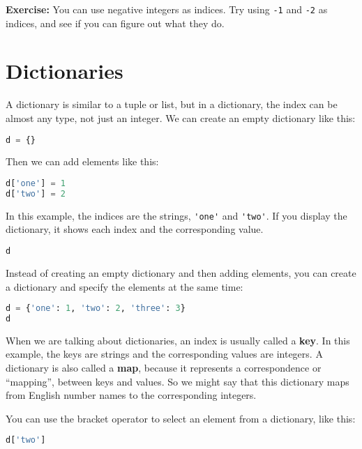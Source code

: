 \textbf{Exercise:} You can use negative integers as indices. Try using
\passthrough{\lstinline!-1!} and \passthrough{\lstinline!-2!} as
indices, and see if you can figure out what they do.

\hypertarget{dictionaries-1}{%
\section{Dictionaries}\label{dictionaries-1}}

A dictionary is similar to a tuple or list, but in a dictionary, the
index can be almost any type, not just an integer. We can create an
empty dictionary like this:

\begin{lstlisting}[language=Python,style=source]
d = {}
\end{lstlisting}

Then we can add elements like this:

\begin{lstlisting}[language=Python,style=source]
d['one'] = 1
d['two'] = 2
\end{lstlisting}

In this example, the indices are the strings,
\passthrough{\lstinline!'one'!} and \passthrough{\lstinline!'two'!}. If
you display the dictionary, it shows each index and the corresponding
value.

\begin{lstlisting}[language=Python,style=source]
d
\end{lstlisting}

Instead of creating an empty dictionary and then adding elements, you
can create a dictionary and specify the elements at the same time:

\begin{lstlisting}[language=Python,style=source]
d = {'one': 1, 'two': 2, 'three': 3}
d
\end{lstlisting}

When we are talking about dictionaries, an index is usually called a
\textbf{key}. In this example, the keys are strings and the
corresponding values are integers. A dictionary is also called a
\textbf{map}, because it represents a correspondence or ``mapping'',
between keys and values. So we might say that this dictionary maps from
English number names to the corresponding integers.

You can use the bracket operator to select an element from a dictionary,
like this:

\begin{lstlisting}[language=Python,style=source]
d['two']
\end{lstlisting}


